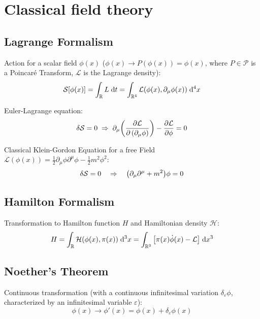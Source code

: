 \section{Classical field theory}
	\subsection{Lagrange Formalism}
		\noindent
		Action for a scalar field $\phi(x)$ (\ie $\phi(x)\rightarrow P(\phi(x))=\phi(x)$, where $P\in\mathcal{P}$ is a Poincaré Transform, $\mathcal{L}$ is the Lagrange density):
		\begin{equation}
			\mathcal{S}\qty[\phi(x)] = \int_{\mathbb{R}} L \;\dd t = \int_{\mathbb{R}^4} \mathcal{L}(\phi(x),\partial_\mu \phi(x)) \;\dd^4 x
		\end{equation}

		\noindent
		Euler-Lagrange equation:
		\begin{equation}
			\delta\mathcal{S} = 0
			\;\Rightarrow\; \partial_\mu \qty(\pdv{\mathcal{L}}{\left(\partial_\mu \phi\right)}) - \pdv{\mathcal{L}}{\phi} = 0
		\end{equation}

		\noindent
		Classical Klein-Gordon Equation for a free Field $\mathcal{L}(\phi(x)) = \frac{1}{2} \partial_\mu \phi \partial^\mu \phi - \frac{1}{2} m^2 \phi^2$:
		\begin{equation}
			\delta \mathcal{S} = 0 \quad \Rightarrow \quad \qty(\partial_\mu \partial^\mu + m^2)\phi = 0
		\end{equation}


	\subsection{Hamilton Formalism}
		\noindent
		Transformation to Hamilton function $H$ and Hamiltonian density $\mathcal{H}$:
		\begin{equation}
			H = \int_{\mathbb{R}} \mathcal{H}(\phi(x),\pi(x)) \;\dd^3 x = \int_{\mathbb{R}^3} \qty[\pi(x)\dot{\phi}(x) - \mathcal{L}] \;\dd x^3
		\end{equation}

	\subsection{Noether's Theorem}
		\noindent
		Continuous transformation (with a continuous infinitesimal variation $\delta_\varepsilon \phi$, characterized by an infinitesimal variable $\varepsilon$):
		\begin{equation}
			\phi(x)\rightarrow\phi'(x) = \phi(x) + \delta_\varepsilon \phi(x)
		\end{equation}

